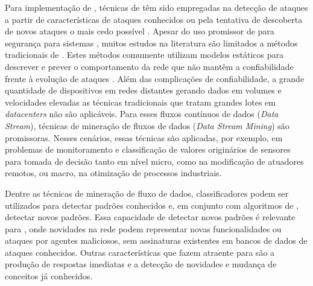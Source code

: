Para implementação de \nids, técnicas de \ml têm sido empregadas na detecção de
ataques a partir de características de ataques conhecidos ou pela tentativa de
descoberta de novos ataques o mais cedo possível
\cite{buczak2016survey,mitchell2014survey}.
Apesar do uso promissor de \ml para segurança para sistemas \iot, muitos estudos
na literatura \cite{buczak2016survey,mitchell2014survey,Tahsien2020} são
limitados a métodos tradicionais de \ml.
Estes métodos comumente utilizam modelos estáticos para descrever e prever o
comportamento da rede que não mantêm a confiabilidade frente à evolução de
ataques \cite{Viegas2019,AndreoniLopez2019}.
Além das complicações de confiabilidade, a grande quantidade de dispositivos em
redes distantes gerando dados em volumes e velocidades elevadas as 
técnicas tradicionais que tratam grandes lotes em \emph{datacenters} não são aplicáveis.
Para esses fluxos contínuos de dados (\emph{Data Stream}), técnicas de
mineração de fluxos de dados (\emph{Data Stream Mining}) são promissoras.
% 
Nesses cenários, essas técnicas são aplicadas, por exemplo, em problemas de
monitoramento e classificação de valores originários de sensores para tomada de
decisão tanto em nível micro, como na modificação de atuadores remotos, ou
macro, na otimização de processos industriais.
% 


Dentre as técnicas de mineração de fluxo de dados, classificadores podem ser
utilizados para detectar padrões conhecidos e, em conjunto com algoritmos de
\nd, detectar novos padrões.
Essa capacidade de detectar novos padrões é relevante para \nids, onde novidades
na rede podem representar novas funcionalidades ou ataques por agentes
maliciosos, sem assinaturas existentes em bancos de dados de ataques conhecidos.
Outras características que fazem \nd atraente para \nids são a produção de
respostas imediatas e a detecção de novidades e mudança de conceitos já
conhecidos.

